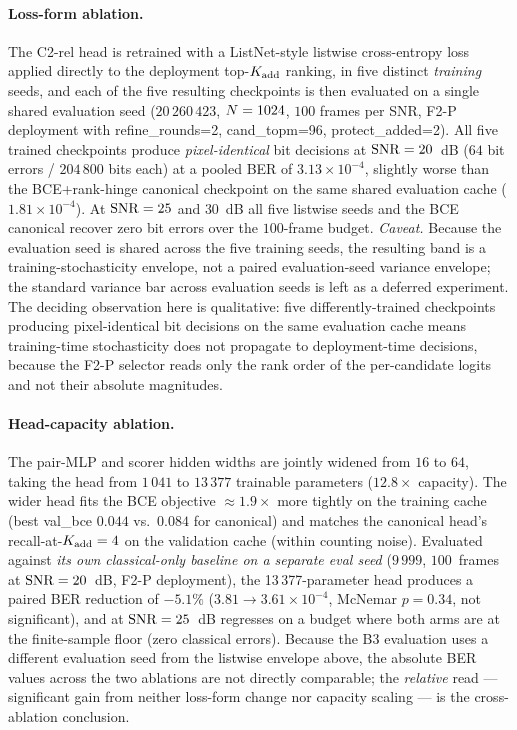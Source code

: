 \paragraph{Loss-form ablation.} The C2-rel head is retrained with a ListNet-style listwise cross-entropy loss applied directly to the deployment top-$K_{\mathrm{add}}$ ranking, in five distinct \emph{training} seeds, and each of the five resulting checkpoints is then evaluated on a single shared evaluation seed ($20\,260\,423$, $N = 1024$, $100$ frames per SNR, F2-P deployment with refine\_rounds=2, cand\_topm=96, protect\_added=2). All five trained checkpoints produce \emph{pixel-identical} bit decisions at $\mathrm{SNR} = 20$~dB ($64$ bit errors / $204\,800$ bits each) at a pooled BER of $3.13 \times 10^{-4}$, slightly worse than the BCE+rank-hinge canonical checkpoint on the same shared evaluation cache ($1.81 \times 10^{-4}$). At $\mathrm{SNR} = 25$ and $30$~dB all five listwise seeds and the BCE canonical recover zero bit errors over the $100$-frame budget. \emph{Caveat.} Because the evaluation seed is shared across the five training seeds, the resulting band is a training-stochasticity envelope, not a paired evaluation-seed variance envelope; the standard variance bar across evaluation seeds is left as a deferred experiment. The deciding observation here is qualitative: five differently-trained checkpoints producing pixel-identical bit decisions on the same evaluation cache means training-time stochasticity does not propagate to deployment-time decisions, because the F2-P selector reads only the rank order of the per-candidate logits and not their absolute magnitudes.

\paragraph{Head-capacity ablation.} The pair-MLP and scorer hidden widths are jointly widened from $16$ to $64$, taking the head from $1\,041$ to $13\,377$ trainable parameters ($12.8\times$ capacity). The wider head fits the BCE objective $\approx 1.9\times$ more tightly on the training cache (best val\_bce $0.044$ vs.\ $0.084$ for canonical) and matches the canonical head's recall-at-$K_{\mathrm{add}} = 4$ on the validation cache (within counting noise). Evaluated against \emph{its own classical-only baseline on a separate eval seed} ($9\,999$, $100$~frames at $\mathrm{SNR} = 20$~dB, F2-P deployment), the 13\,377-parameter head produces a paired BER reduction of $-5.1\%$ ($3.81 \to 3.61 \times 10^{-4}$, McNemar $p = 0.34$, not significant), and at $\mathrm{SNR} = 25$~dB regresses on a budget where both arms are at the finite-sample floor (zero classical errors). Because the B3 evaluation uses a different evaluation seed from the listwise envelope above, the absolute BER values across the two ablations are not directly comparable; the \emph{relative} read --- significant gain from neither loss-form change nor capacity scaling --- is the cross-ablation conclusion.

